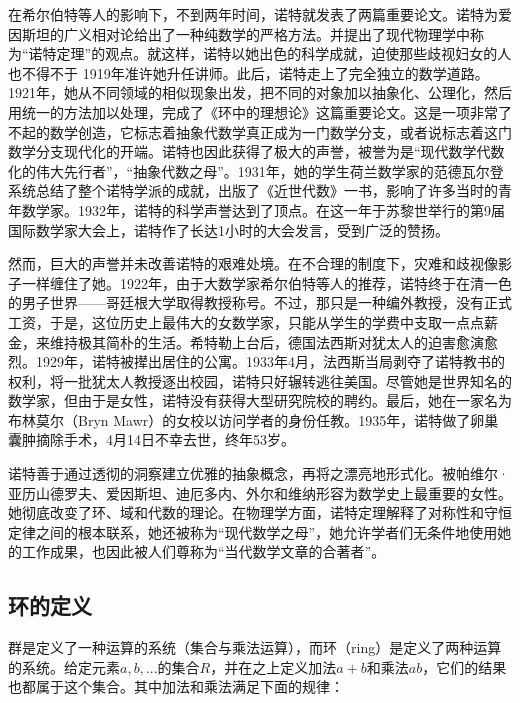 \documentclass[b5paper]{ctexart}
\begin{document}
在希尔伯特等人的影响下，不到两年时间，诺特就发表了两篇重要论文。诺特为爱因斯坦的广义相对论给出了一种纯数学的严格方法。并提出了现代物理学中称为“诺特定理”的观点。就这样，诺特以她出色的科学成就，迫使那些歧视妇女的人也不得不于 1919年准许她升任讲师。此后，诺特走上了完全独立的数学道路。1921年，她从不同领域的相似现象出发，把不同的对象加以抽象化、公理化，然后用统一的方法加以处理，完成了《环中的理想论》这篇重要论文。这是一项非常了不起的数学创造，它标志着抽象代数学真正成为一门数学分支，或者说标志着这门数学分支现代化的开端。诺特也因此获得了极大的声誉，被誉为是“现代数学代数化的伟大先行者”，“抽象代数之母”。1931年，她的学生荷兰数学家的范德瓦尔登系统总结了整个诺特学派的成就，出版了《近世代数》一书，影响了许多当时的青年数学家。1932年，诺特的科学声誉达到了顶点。在这一年于苏黎世举行的第9届国际数学家大会上，诺特作了长达1小时的大会发言，受到广泛的赞扬。

然而，巨大的声誉并未改善诺特的艰难处境。在不合理的制度下，灾难和歧视像影子一样缠住了她。1922年，由于大数学家希尔伯特等人的推荐，诺特终于在清一色的男子世界——哥廷根大学取得教授称号。不过，那只是一种编外教授，没有正式工资，于是，这位历史上最伟大的女数学家，只能从学生的学费中支取一点点薪金，来维持极其简朴的生活。希特勒上台后，德国法西斯对犹太人的迫害愈演愈烈。1929年，诺特被撵出居住的公寓。1933年4月，法西斯当局剥夺了诺特教书的权利，将一批犹太人教授逐出校园，诺特只好辗转逃往美国。尽管她是世界知名的数学家，但由于是女性，诺特没有获得大型研究院校的聘约。最后，她在一家名为布林莫尔（Bryn Mawr）的女校以访问学者的身份任教。1935年，诺特做了卵巢囊肿摘除手术，4月14日不幸去世，终年53岁。

诺特善于通过透彻的洞察建立优雅的抽象概念，再将之漂亮地形式化。被帕维尔·亚历山德罗夫、爱因斯坦、迪厄多内、外尔和维纳形容为数学史上最重要的女性。她彻底改变了环、域和代数的理论。在物理学方面，诺特定理解释了对称性和守恒定律之间的根本联系，她还被称为“现代数学之母”，她允许学者们无条件地使用她的工作成果，也因此被人们尊称为“当代数学文章的合著者”\cite{Wiki-Noether}。

\subsection{环的定义}
群是定义了一种运算的系统（集合与乘法运算），而环（ring）是定义了两种运算的系统。给定元素$a, b, ...$的集合$R$，并在之上定义加法$a+b$和乘法$ab$，它们的结果也都属于这个集合。其中加法和乘法满足下面的规律：
\end{document}
